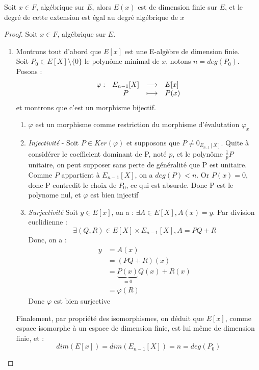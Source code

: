 \documentclass[a4paper,12pt,french,draft]{report}
\begin{document}
			\begin{proposition}
				Soit \(x \in F \), algébrique sur \(E\), alors \(E(x)\) est de dimension finie sur \(E\), et le degré de cette extension est égal au degré algébrique de \(x\){}
			\end{proposition}
				\begin{proof}
					Soit \(x \in F \), algébrique sur \(E\).{}
					
	\begin{enumerate}
		\item Montrons tout d'abord que $E[x]$ est une E-algèbre de dimension finie.\\ 
						Soit \(P_{0} \in E[X]\setminus\{0\} \) le polynôme minimal de $x$, notons \(n = deg(P_{0})\).
					Posons : 
					\[{}
						\begin{array}[t]{lccl}
							\varphi : 
							& E_{n-1}[X] & \longrightarrow & E[x] \\
							& P & \longmapsto & P(x)
						\end{array}
					\] et montrons que c'est un morphisme bijectif.
					
					\begin{enumerate}
						\item $\varphi$ est un morphisme comme restriction du morphisme d'évalutation $\varphi_{x}$
						\item \emph{Injectivité} - Soit \(P \in Ker(\varphi)\) et supposons que \(P \neq 0_{E_{{n_-1}}[X]} \). Quite à considérer le coefficient dominant de P, noté \(p\), et le polynôme \(\frac{1}{p}P\) unitaire, on peut supposer sans perte de généralité que P est unitaire. Comme \(P\) appartient à \(E_{n-1}[X]\), on a \(deg(P) < n\). Or \(P(x) = 0\), donc P contredit le choix de \(P_{0}\), ce qui est absurde. Donc P est le polynome nul, et \(\varphi\) est bien injectif
						
						\item \emph{Surjectivité}
						Soit $y \in E[x]$, on a : $\exists A \in E[X], A(x) = y$. Par division euclidienne : 
						\[{}
							\exists (Q,R) \in E[X] \times E_{n-1}[X] , A = PQ + R
						\]
						Donc, on a :
						\[{}
						\begin{aligned}
							y &= A(x) \\
							&= (PQ + R)(x)\\
							&=\underbrace{P(x)}_{=0}Q(x) + R(x)\\
							&=\varphi(R)
						\end{aligned}
						\]
						Donc $\varphi$ est bien surjective
					\end{enumerate}
				Finalement, par propriété des isomorphismes, on déduit que $E[x]$, comme espace isomorphe à un espace de dimension finie, est lui même de dimension finie, et :
				\[{}
				dim(E[x]) = dim(E_{n-1}[X]) = n = deg(P_{0})
				\]
		

\end{enumerate}
\end{proof}
\end{document}
